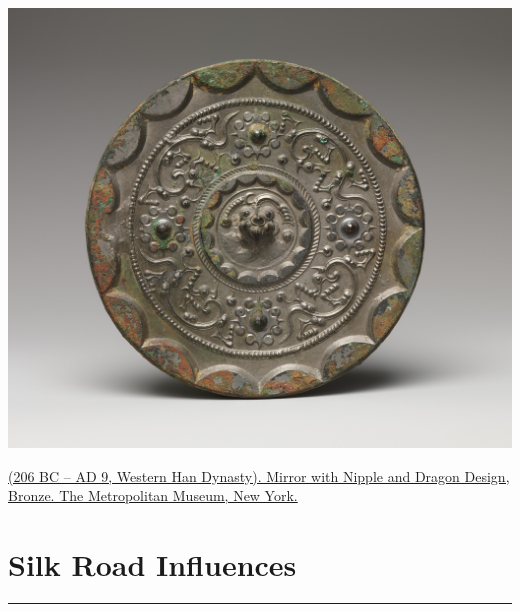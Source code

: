 \documentclass[
]{book}
\begin{document}
\includegraphics[width=1\textwidth,height=\textheight]{images/Mirror_with_Nipple_and_Dragon_Design.jpg}

\href{https://www.metmuseum.org/art/collection/search/74429}{(206 BC -- AD 9, Western Han Dynasty). Mirror with Nipple and Dragon Design, Bronze. The Metropolitan Museum, New York.}

\hypertarget{tang}{%
\chapter*{Silk Road Influences}\label{tang}}

\begin{center}\rule{0.5\linewidth}{0.5pt}\end{center}
\end{document}
